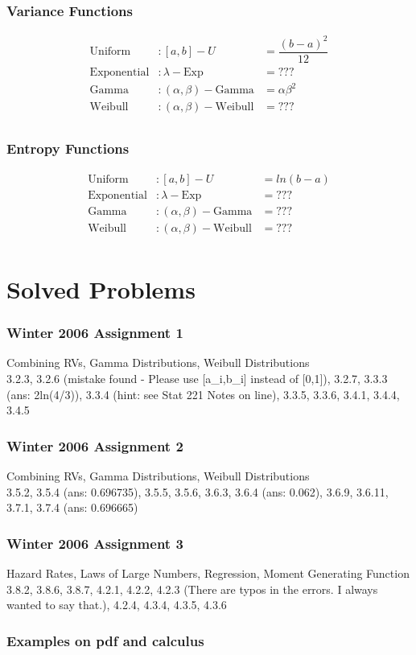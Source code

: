 \documentclass[10pt]{report}
\begin{document}
\pagebreak

\section*{Variance Functions}
\begin{align*}
\text{Uniform}& : [a,b]-U& = \dfrac{\left(b-a\right)^{2}}{12}\\
\text{Exponential}& : \lambda-\text{Exp}& = ???\\
\text{Gamma}& : (\alpha, \beta)-\text{Gamma}& = \alpha\beta^{2}\\ 
\text{Weibull}& : (\alpha, \beta)-\text{Weibull}& = ???\\
\end{align*}

\pagebreak

\section*{Entropy Functions}
\begin{align*}
\text{Uniform}& : [a,b]-U& = ln\left(b-a\right)\\
\text{Exponential}& : \lambda-\text{Exp}& = ???\\
\text{Gamma}& : (\alpha, \beta)-\text{Gamma}& = ???\\ 
\text{Weibull}& : (\alpha, \beta)-\text{Weibull}& = ???\\
\end{align*}

\pagebreak

\part{Solved Problems}

\section*{Winter 2006 Assignment 1}
Combining RVs, Gamma Distributions, Weibull Distributions\\
3.2.3, 3.2.6 (mistake found - Please use [a\_i,b\_i] instead of [0,1]), 3.2.7, 3.3.3 (ans: 2ln(4/3)), 3.3.4 (hint: see Stat 221 Notes on line), 3.3.5, 3.3.6, 3.4.1, 3.4.4, 3.4.5\\

\section*{Winter 2006 Assignment 2}
Combining RVs, Gamma Distributions, Weibull Distributions\\
3.5.2, 3.5.4 (ans: 0.696735), 3.5.5, 3.5.6, 3.6.3, 3.6.4 (ans: 0.062), 3.6.9, 3.6.11, 3.7.1, 3.7.4 (ans: 0.696665)\\

\section*{Winter 2006 Assignment 3}
Hazard Rates, Laws of Large Numbers, Regression, Moment Generating Function\\
3.8.2, 3.8.6, 3.8.7, 4.2.1, 4.2.2, 4.2.3 (There are typos in the errors. I always wanted to say that.), 4.2.4, 4.3.4, 4.3.5, 4.3.6\\

\section*{Examples on pdf and calculus}
\end{document}
